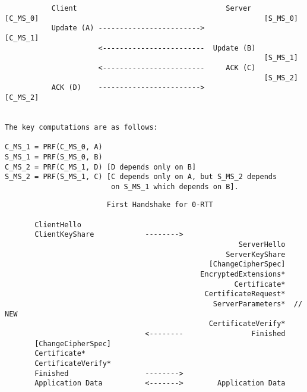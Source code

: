 \documentclass[helvetica]{seminar}
\begin{document}
\begin{slide}

\begin{footnotesize}
\begin{verbatim}
           Client                                   Server
[C_MS_0]                                                     [S_MS_0]
           Update (A) ------------------------>
[C_MS_1]                                            
                      <------------------------  Update (B)
                                                             [S_MS_1]
                      <------------------------     ACK (C)
                                                             [S_MS_2]
           ACK (D)    ------------------------>
[C_MS_2]
       

The key computations are as follows:

C_MS_1 = PRF(C_MS_0, A)
S_MS_1 = PRF(S_MS_0, B)
C_MS_2 = PRF(C_MS_1, D) [D depends only on B]
S_MS_2 = PRF(S_MS_1, C) [C depends only on A, but S_MS_2 depends
                         on S_MS_1 which depends on B].
\end{verbatim}
\end{footnotesize}

\end{slide}


\begin{slide}
\begin{footnotesize}
\begin{verbatim}
                        First Handshake for 0-RTT

       ClientHello
       ClientKeyShare            -------->
                                                       ServerHello
                                                    ServerKeyShare
                                                [ChangeCipherSpec]
                                              EncryptedExtensions*
                                                      Certificate*
                                               CertificateRequest*
                                                 ServerParameters*  // NEW
                                                CertificateVerify*
                                 <--------                Finished
       [ChangeCipherSpec]
       Certificate*
       CertificateVerify*
       Finished                  -------->
       Application Data          <------->        Application Data
\end{verbatim}
\end{footnotesize}
\end{slide}
\end{document}
